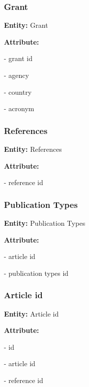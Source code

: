 \documentclass{article}
\begin{document}
\subsubsection{Grant}
\setlist 
\begin{mylist}  
 \item \textbf{Entity:} Grant
 \item \textbf{Attribute:}
  \item - grant id  
  \item - agency  
  \item - country
  \item - acronym
\end{mylist}  

\subsubsection{References}
\setlist 
\begin{mylist}  
 \item \textbf{Entity:} References
 \item \textbf{Attribute:}
  \item - reference id  
\end{mylist}  

\subsubsection{Publication Types}
\setlist 
\begin{mylist}  
 \item \textbf{Entity:} Publication Types
 \item \textbf{Attribute:}
  \item - article id  
  \item - publication types id  
\end{mylist}

\subsubsection{Article id}
\setlist 
\begin{mylist}  
 \item \textbf{Entity:} Article id
 \item \textbf{Attribute:}
  \item - id
  \item - article id  
  \item - reference id  
\end{mylist}  
\end{document}
